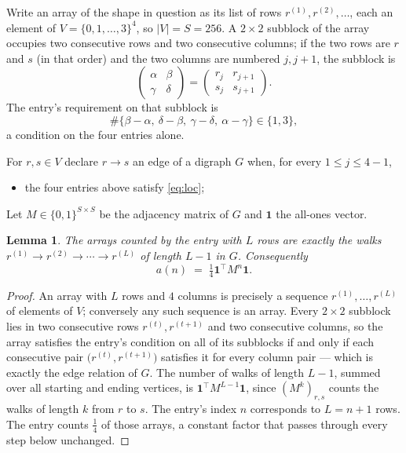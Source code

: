 \documentclass[11pt,a4paper]{article}
\theoremstyle{plain}
\newtheorem{lemma}[theorem]{Lemma}
\theoremstyle{definition}
\begin{document}
Write an array of the shape in question as its list of rows
$r^{(1)},r^{(2)},\dots$, each an element of
$V=\{0,1,\dots,3\}^{4}$, so $|V|=S=256$. A $2\times2$ subblock of the array
occupies two consecutive rows and two consecutive columns; if the two rows are $r$
and $s$ (in that order) and the two columns are numbered $j,j+1$,
the subblock is
\[
\begin{pmatrix}\alpha&\beta\\\gamma&\delta\end{pmatrix}=\begin{pmatrix}r_j&r_{j+1}\\s_j&s_{j+1}\end{pmatrix}.
\]
The entry's requirement on that subblock is
\begin{equation}\label{eq:loc}
\#\{\beta-\alpha,\ \delta-\beta,\ \gamma-\delta,\ \alpha-\gamma\}\in\{1,3\},
\end{equation}
a condition on the four entries alone.

For $r,s\in V$ declare $r\to s$ an edge of a digraph $G$ when, for every
$1\le j\le 4-1$,
\begin{itemize}
\item the four entries above satisfy \eqref{eq:loc};

\end{itemize}
Let $M\in\{0,1\}^{S\times S}$ be the adjacency matrix of $G$ and $\mathbf{1}$ the
all-ones vector.

\begin{lemma}\label{lem:walk}
The arrays counted by the entry with $L$ rows are exactly the walks
$r^{(1)}\to r^{(2)}\to\cdots\to r^{(L)}$ of length $L-1$ in $G$. Consequently
\[
a(n)\;=\;\tfrac1{4}\mathbf{1}^{\!\top}M^{n}\mathbf{1} .
\]
\end{lemma}

\begin{proof}
An array with $L$ rows and $4$ columns is precisely a sequence
$r^{(1)},\dots,r^{(L)}$ of elements of $V$; conversely any such sequence is an array.
Every $2\times2$ subblock lies in two consecutive rows $r^{(t)},r^{(t+1)}$ and two
consecutive columns, so the array satisfies the entry's condition on all of its subblocks
if and only if each consecutive pair $\bigl(r^{(t)},r^{(t+1)}\bigr)$ satisfies it for
every column pair --- which is exactly the edge relation of $G$. The number of walks of
length $L-1$, summed over all starting and ending vertices, is
$\mathbf{1}^{\!\top}M^{L-1}\mathbf{1}$, since $(M^{k})_{r,s}$ counts the walks of
length $k$ from $r$ to $s$. The entry's index $n$ corresponds to $L=n+1$ rows. The entry counts $\tfrac1{4}$ of those arrays, a constant factor that passes through every step below unchanged.
\end{proof}
\end{document}
